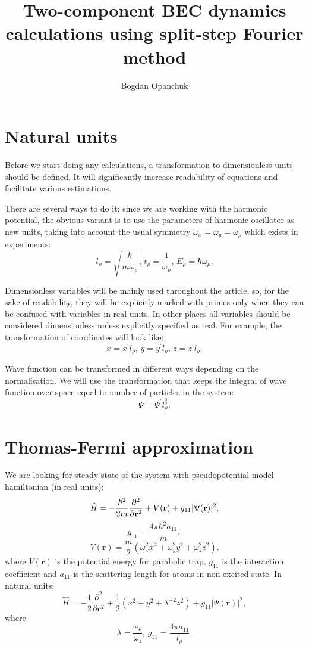 \documentclass[12pt,notitlepage]{report}
\title{Two-component BEC dynamics calculations using split-step Fourier method}
\author{Bogdan Opanchuk}
\begin{document}
\maketitle

\section*{Natural units}

Before we start doing any calculations, a transformation to dimensionless units should be defined. It will significantly increase readability of equations and facilitate various estimations.

There are several ways to do it; since we are working with the harmonic potential, the obvious variant is to use the parameters of harmonic oscillator as new units, taking into account the usual symmetry $\omega_x = \omega_y = \omega_\rho$ which exists in experiments:
\[ l_\rho =  \sqrt{\frac{\hbar}{m\omega_\rho}},\, t_\rho = \frac{1}{\omega_\rho},\, E_\rho = \hbar \omega_\rho. \]

Dimensionless variables will be mainly used throughout the article, so, for the sake of readability, they will be explicitly marked with primes only when they can be confused with variables in real units. In other places all variables should be considered dimensionless unless explicitly specified as real. For example, the transformation of coordinates will look like:
\[ x = x^\prime l_\rho,\, y = y^\prime l_\rho,\, z = z^\prime l_\rho. \]

Wave function can be transformed in different ways depending on the normalisation. We will use the transformation that keeps the integral of wave function over space equal to number of particles in the system:
\[ \Psi = \Psi^\prime l_\rho^\frac{3}{2}. \]

\section*{Thomas-Fermi approximation}

We are looking for steady state of the system with pseudopotential model hamiltonian (in real units):
\[ 
\hat{H} = -\frac{\hbar^2}{2m} \frac{\partial^2}{\partial \mathbf{r}^2} + \\
V(\mathbf{r}) + g_{11} \vert \Psi(\mathbf{r}) \vert^2,
\]
\[ g_{11} = \frac{4 \pi \hbar^2 a_{11}}{m}, \]
\[ V(\mathbf{r}) = \frac{m}{2} \left( \omega_x^2 x^2 + \omega_y^2 y^2 + \omega_z^2 z^2 \right). \]
where $V(\mathbf{r})$ is the potential energy for parabolic trap, $g_{11}$ is the interaction coefficient and $a_{11}$ is the scattering length for atoms in non-excited state. In natural units:
\[
\hat{H} = -\frac{1}{2} \frac{\partial^2}{\partial \mathbf{r}^2} + 
\frac{1}{2} \left( x^2 + y^2 + \lambda^{-2} z^2 \right) + g_{11} \vert \Psi(\mathbf{r}) \vert^2,
\]
where
\[ \lambda = \frac{\omega_\rho}{\omega_z},\, g_{11} = \frac{4 \pi a_{11}}{l_\rho}. \]
\end{document}
